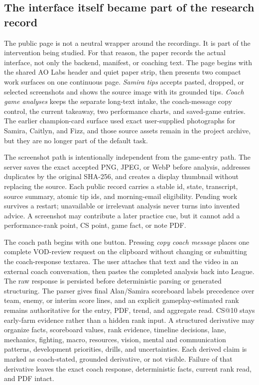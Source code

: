 \documentclass[12pt,letterpaper]{article}
\begin{document}
\subsection{The interface itself became part of the research record}

The public page is not a neutral wrapper around the recordings. It is part of the intervention being studied. For that reason, the paper records the actual interface, not only the backend, manifest, or coaching text. The page begins with the shared AO Labs header and quiet paper strip, then presents two compact work surfaces on one continuous page. \emph{Samira tips} accepts pasted, dropped, or selected screenshots and shows the source image with its grounded tips. \emph{Coach game analyses} keeps the separate long-text intake, the coach-message copy control, the current takeaway, two performance charts, and saved-game entries. The earlier champion-card surface used exact user-supplied photographs for Samira, Caitlyn, and Fizz, and those source assets remain in the project archive, but they are no longer part of the default task.

The screenshot path is intentionally independent from the game-entry path. The server saves the exact accepted PNG, JPEG, or WebP before analysis, addresses duplicates by the original SHA-256, and creates a display thumbnail without replacing the source. Each public record carries a stable id, state, transcript, source summary, atomic tip ids, and morning-email eligibility. Pending work survives a restart; unavailable or irrelevant analysis never turns into invented advice. A screenshot may contribute a later practice cue, but it cannot add a performance-rank point, CS point, game fact, or note PDF.

The coach path begins with one button. Pressing \emph{copy coach message} places one complete VOD-review request on the clipboard without changing or submitting the coach-response textarea. The user attaches that text and the video in an external coach conversation, then pastes the completed analysis back into League. The raw response is persisted before deterministic parsing or generated structuring. The parser gives final Alan/Samira scoreboard labels precedence over team, enemy, or interim score lines, and an explicit gameplay-estimated rank remains authoritative for the entry, PDF, trend, and aggregate read. CS@10 stays early-farm evidence rather than a hidden rank input. A structured derivative may organize facts, scoreboard values, rank evidence, timeline decisions, lane, mechanics, fighting, macro, resources, vision, mental and communication patterns, development priorities, drills, and uncertainties. Each derived claim is marked as coach-stated, grounded derivative, or not visible. Failure of that derivative leaves the exact coach response, deterministic facts, current rank read, and PDF intact.
\end{document}
